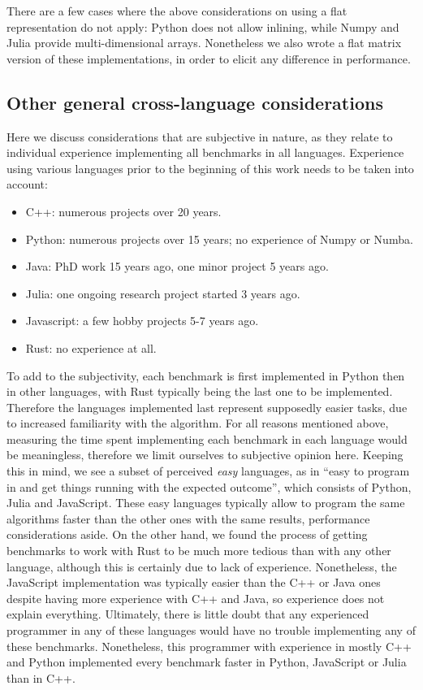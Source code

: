 \documentclass[11pt,a4paper,notitlepage]{article}
\begin{document}
There are a few cases where the above considerations on using a flat
representation do not apply: Python does not allow inlining, while
Numpy and Julia provide multi-dimensional arrays. Nonetheless we also
wrote a flat matrix version of these implementations, in order
to elicit any difference in performance. 

\subsection{Other general cross-language considerations}
Here we discuss considerations that are subjective in nature, as they
relate to individual experience implementing all benchmarks in all
languages. Experience using various languages prior to the beginning
of this work needs to be taken into account:
\begin{itemize}
\item C++: numerous projects over 20 years.
\item Python: numerous projects over 15 years; no experience of Numpy
  or Numba.
\item Java: PhD work 15 years ago, one minor project 5 years ago.
\item Julia: one ongoing research project started 3 years ago.
\item Javascript: a few hobby projects 5-7 years ago.
\item Rust: no experience at all.
\end{itemize}
To add to the subjectivity, each benchmark is first implemented in
Python then in other languages, with Rust typically being the last one
to be implemented. Therefore the languages implemented last represent
supposedly easier tasks, due to increased familiarity with the
algorithm. For all reasons mentioned above, measuring the
time spent implementing each benchmark in each language would be
meaningless, therefore we limit ourselves to subjective opinion here.
Keeping this in mind, we see a subset of perceived
\emph{easy} languages, as in ``easy to program in and get things running
with the expected outcome'', which consists of Python, Julia and
JavaScript. These 
easy languages typically allow to program the same algorithms faster
than the other ones with the same results, performance considerations
aside.
On the other hand, we found the process of getting benchmarks to work
with Rust to be much more tedious than with any other language,
although this is certainly due to lack of experience. Nonetheless, the
JavaScript implementation was typically easier than the C++ or Java ones
despite having more experience with C++ and Java, so
experience does not explain everything.
Ultimately, there is little doubt that any experienced programmer in
any of these languages would have no trouble implementing any of these
benchmarks. Nonetheless, this programmer with experience in mostly C++
and Python implemented every benchmark faster in Python, JavaScript or Julia
than in C++.
\end{document}
